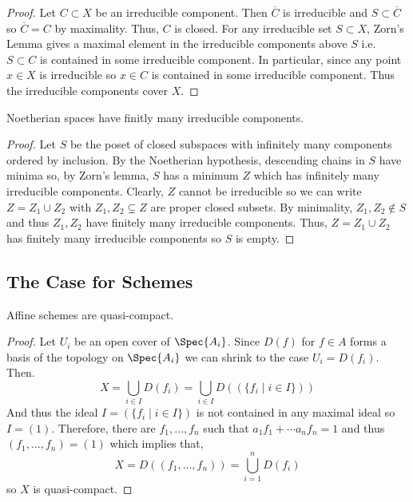 \documentclass[12pt]{article}
\begin{document}
\begin{proof}
Let $C \subset X$ be an irreducible component. Then $\overline{C}$ is irreducible and $S \subset \overline{C}$ so $\overline{C} = C$ by maximality. Thus, $C$ is closed. For any irreducible set $S \subset X$, Zorn's Lemma gives a maximal element in the irreducible components above $S$ i.e. $S \subset C$ is contained in some irreducible component. In particular, since any point $x \in X$ is irreducible so $x \in C$ is contained in some irreducible component. Thus the irreducible components cover $X$.
\end{proof}

\begin{lemma}
Noetherian spaces have finitly many irreducible components.
\end{lemma}

\begin{proof}
Let $S$ be the poset of closed subspaces with infinitely many components ordered by inclusion. By the Noetherian hypothesis, descending chains in $S$ have minima so, by Zorn's lemma, $S$ has a minimum $Z$ which has infinitely many irreducible components. Clearly, $Z$ cannot be irreducible so we can write $Z = Z_1 \cup Z_2$ with $Z_1, Z_2 \subsetneq Z$ are proper closed subsets. By minimality, $Z_1, Z_2 \notin S$ and thus $Z_1, Z_2$ have finitely many irreducible components. Thus, $Z = Z_1 \cup Z_2$ has finitely many irreducible components so $S$ is empty. 
\end{proof}



\subsection{The Case for Schemes}


\begin{lemma}
Affine schemes are quasi-compact.
\end{lemma}

\begin{proof}
Let $U_i$ be an open cover of $\Spec{A_i}$. Since $D(f)$ for $f \in A$ forms a basis of the topology on $\Spec{A_i}$ we can shrink to the case $U_i = D(f_i)$. Then.
\[ X = \bigcup_{i  \in I} D(f_i) = \bigcup_{i \in I} D(( \{ f_i \mid i \in I \} )) \]
And thus the ideal $I = ( \{ f_i \mid i \in I \} )$ is not contained in any maximal ideal so $I = (1)$. Therefore, there are $f_1, \dots, f_n$ such that $a_1 f_1 + \cdots a_n f_n = 1$ and thus $(f_1, \dots, f_n) = (1)$ which implies that,
\[ X = D((f_1, \dots, f_n)) = \bigcup_{i = 1}^n D(f_i) \]
so $X$ is quasi-compact.
\end{proof}
\end{document}
